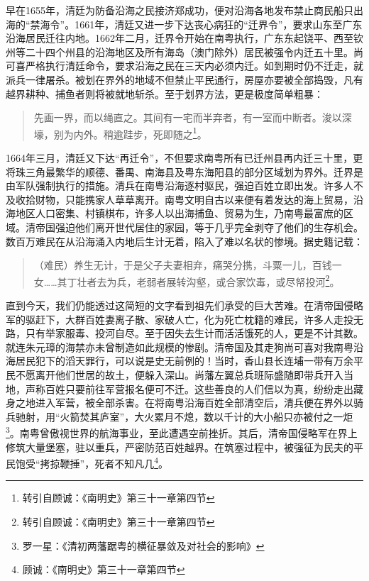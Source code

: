 早在1655年，清廷为防备沿海之民接济郑成功，便对沿海各地发布禁止商民船只出海的“禁海令”。1661年，清廷又进一步下达丧心病狂的“迁界令”，要求山东至广东沿海居民迁往内地。1662年二月，迁界令开始在南粤执行，广东东起饶平、西至钦州等二十四个州县的沿海地区及所有海岛（澳门除外）居民被强令内迁五十里。尚可喜严格执行清廷命令，要求沿海之民在三天内必须内迁。如到期时仍不迁走，就派兵一律屠杀。被划在界外的地域不但禁止平民通行，房屋亦要被全部捣毁，凡有越界耕种、捕鱼者则将被就地斩杀。至于划界方法，更是极度简单粗暴：

\begin{quote}

先画一界，而以绳直之。其间有一宅而半弃者，有一室而中断者。浚以深壕，别为内外。稍逾跬步，死即随之\footnote{转引自顾诚：《南明史》第三十一章第四节}。

\end{quote}

1664年三月，清廷又下达“再迁令”，不但要求南粤所有已迁州县再内迁三十里，更将珠三角最繁华的顺德、番禺、南海县及粤东海阳县的部分区域划为界外。迁界是由军队强制执行的措施。清兵在南粤沿海逐村驱民，强迫百姓立即出发。许多人不及收拾财物，只能携家人草草离开。南粤文明自古以来便有着发达的海上贸易，沿海地区人口密集、村镇棋布，许多人以出海捕鱼、贸易为生，乃南粤最富庶的区域。清帝国强迫他们离开世代居住的家园，等于几乎完全剥夺了他们的生存机会。数百万难民在从沿海涌入内地后生计无着，陷入了难以名状的惨境。据史籍记载：

\begin{quote}
（难民）养生无计，于是父子夫妻相弃，痛哭分携，斗粟一儿，百钱一女……其丁壮者去为兵，老弱者展转沟壑，或合家饮毒，或尽帑投河\footnote{转引自顾诚：《南明史》第三十一章第四节}。

\end{quote}

直到今天，我们仍能透过这简短的文字看到祖先们承受的巨大苦难。在清帝国侵略军的驱赶下，大群百姓妻离子散、家破人亡，化为死亡枕籍的难民，许多人走投无路，只有举家服毒、投河自尽。至于因失去生计而活活饿死的人，更是不计其数。就连朱元璋的海禁亦未曾制造如此规模的惨剧。清帝国及其走狗尚可喜对我南粤沿海居民犯下的滔天罪行，可以说是史无前例的！当时，香山县长连埔一带有万余平民不愿离开他们世居的故土，便躲入深山。尚藩左翼总兵班际盛随即带兵开入当地，声称百姓只要前往军营报名便可不迁。这些善良的人们信以为真，纷纷走出藏身之地进入军营，被全部杀害。在将南粤沿海百姓全部清空后，清兵便在界外以骑兵驰射，用“火箭焚其庐室”，大火累月不熄，数以千计的大小船只亦被付之一炬\footnote{罗一星：《清初两藩踞粤的横征暴敛及对社会的影响》}。南粤曾傲视世界的航海事业，至此遭遇空前挫折。其后，清帝国侵略军在界上修筑大量堡塞，驻以重兵，严密防范百姓越界。在筑塞过程中，被强征为民夫的平民饱受“拷掠鞭捶”，死者不知凡几\footnote{顾诚：《南明史》第三十一章第四节}。

